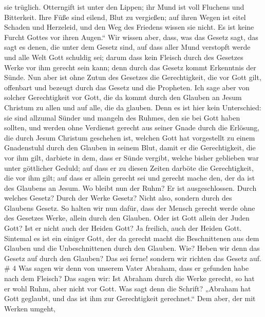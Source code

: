 sie trüglich. Otterngift ist unter den Lippen;  ihr Mund
ist voll Fluchens und Bitterkeit.  Ihre Füße sind eilend,
Blut zu vergießen;  auf ihren Wegen ist eitel Schaden und
Herzeleid,  und den Weg des Friedens wissen sie nicht.
 Es ist keine Furcht Gottes vor ihren Augen.``
 Wir wissen aber, dass, was das Gesetz sagt, das sagt es
denen, die unter dem Gesetz sind, auf dass aller Mund verstopft werde
und alle Welt Gott schuldig sei;  darum dass kein Fleisch
durch des Gesetzes Werke vor ihm gerecht sein kann; denn durch das
Gesetz kommt Erkenntnis der Sünde.  Nun aber ist ohne Zutun
des Gesetzes die Gerechtigkeit, die vor Gott gilt, offenbart und bezeugt
durch das Gesetz und die Propheten.  Ich sage aber von
solcher Gerechtigkeit vor Gott, die da kommt durch den Glauben an Jesum
Christum zu allen und auf alle, die da glauben.  Denn es
ist hier kein Unterschied: sie sind allzumal Sünder und mangeln des
Ruhmes, den sie bei Gott haben sollten,  und werden ohne
Verdienst gerecht aus seiner Gnade durch die Erlösung, die durch Jesum
Christum geschehen ist,  welchen Gott hat vorgestellt zu
einem Gnadenstuhl durch den Glauben in seinem Blut, damit er die
Gerechtigkeit, die vor ihm gilt, darbiete in dem, dass er Sünde vergibt,
welche bisher geblieben war unter göttlicher Geduld;  auf
dass er zu diesen Zeiten darböte die Gerechtigkeit, die vor ihm gilt;
auf dass er allein gerecht sei und gerecht mache den, der da ist des
Glaubens an Jesum.  Wo bleibt nun der Ruhm? Er ist
ausgeschlossen. Durch welches Gesetz? Durch der Werke Gesetz? Nicht
also, sondern durch des Glaubens Gesetz.  So halten wir nun
dafür, dass der Mensch gerecht werde ohne des Gesetzes Werke, allein
durch den Glauben.  Oder ist Gott allein der Juden Gott?
Ist er nicht auch der Heiden Gott? Ja freilich, auch der Heiden Gott.
 Sintemal es ist ein einiger Gott, der da gerecht macht die
Beschnittenen aus dem Glauben und die Unbeschnittenen durch den Glauben.
 Wie? Heben wir denn das Gesetz auf durch den Glauben? Das
sei ferne! sondern wir richten das Gesetz auf. \# 4  Was
sagen wir denn von unserem Vater Abraham, dass er gefunden habe nach dem
Fleisch?  Das sagen wir: Ist Abraham durch die Werke
gerecht, so hat er wohl Ruhm, aber nicht vor Gott.  Was sagt
denn die Schrift? „Abraham hat Gott geglaubt, und das ist ihm zur
Gerechtigkeit gerechnet.``  Dem aber, der mit Werken umgeht,
